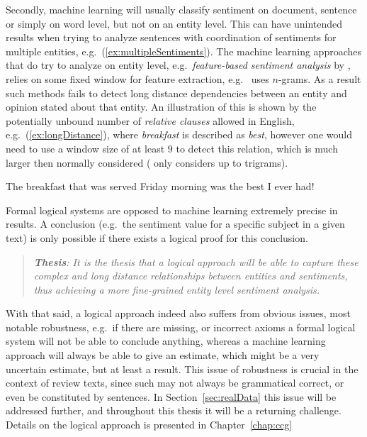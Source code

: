 Secondly, machine learning will usually classify sentiment on document, sentence or simply on word level, but not on an entity level. This can have unintended results when trying to analyze sentences with coordination of sentiments for multiple entities, e.g.\ (\ref{ex:multipleSentiments}). The machine learning approaches that do try to analyze on entity level, e.g.\ \emph{feature-based sentiment analysis} by \citeauthor{webDataMining} , relies on some fixed window for feature extraction, e.g.\ \citeauthor{webDataMining}  uses $n$-grams. As a result such methods fails to detect long distance dependencies between an entity and opinion stated about that entity. An illustration of this is shown by the potentially unbound number of \emph{relative clauses} allowed in English, e.g.\ (\ref{ex:longDistance}), where \emph{breakfast} is described as \emph{best}, however one would need to use a window size of at least $9$ to detect this relation, which is much larger then normally considered (\citeauthor{webDataMining} only considers up to trigrams).
\begin{numquote}
	The breakfast that was served Friday morning was the best I ever had!
	\label{ex:longDistance}
\end{numquote}

Formal logical systems are opposed to machine learning extremely precise in results. A conclusion (e.g.\ the sentiment value for a specific subject in a given text) is only possible if there exists a logical proof for this conclusion. 

\begin{quote}
\it\textbf{Thesis}: It is the thesis that a logical approach will be able to capture these complex and long distance relationships between entities and sentiments, thus achieving a more fine-grained entity level sentiment analysis.
\end{quote}

With that said, a logical approach indeed also suffers from obvious issues, most notable robustness, e.g.\ if there are missing, or incorrect axioms a formal logical system will not be able to conclude anything, whereas a machine learning approach will always be able to give an estimate, which might be a very uncertain estimate, but at least a result. This issue of robustness is crucial in the context of review texts, since such may not always be grammatical correct, or even be constituted by sentences. In Section~\ref{sec:realData} this issue will be addressed further, and throughout this thesis it will be a returning challenge. Details on the logical approach is presented in Chapter~\ref{chap:ccg}	

